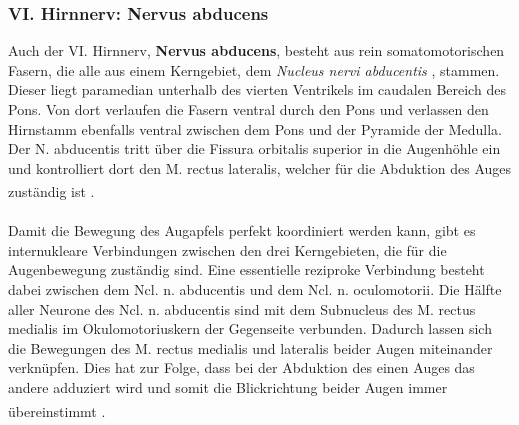 \subsubsection*{VI. Hirnnerv: Nervus abducens} 
Auch der VI. Hirnnerv, \textbf{Nervus abducens}, besteht aus rein somatomotorischen Fasern, die alle aus einem Kerngebiet, dem \textit{Nucleus nervi abducentis} , stammen. Dieser liegt paramedian unterhalb des vierten Ventrikels im caudalen Bereich des Pons. Von dort verlaufen die Fasern ventral durch den Pons und verlassen den Hirnstamm ebenfalls ventral zwischen dem Pons und der Pyramide der Medulla. Der N. abducentis tritt über die Fissura orbitalis superior in die Augenhöhle ein und kontrolliert dort den M. rectus lateralis, welcher für die Abduktion des Auges zuständig ist \textsuperscript{\cite[Kap.~10]{crossman2014neuroanatomy}}. \\    
\\ \noindent Damit die Bewegung des Augapfels perfekt koordiniert werden kann, gibt es internukleare Verbindungen zwischen den drei Kerngebieten, die für die Augenbewegung zuständig sind.    
Eine essentielle reziproke Verbindung besteht dabei zwischen dem Ncl. n. abducentis und dem Ncl. n. oculomotorii. Die Hälfte aller Neurone des Ncl. n. abducentis sind mit dem Subnucleus des M. rectus medialis im Okulomotoriuskern der Gegenseite verbunden. Dadurch lassen sich die Bewegungen des M. rectus medialis und lateralis beider Augen miteinander verknüpfen. Dies hat zur Folge, dass bei der Abduktion des einen Auges das andere adduziert wird und somit die Blickrichtung beider Augen immer übereinstimmt \textsuperscript{\cite[Kap.~6]{trepel2011neuroanatomie}}. 

